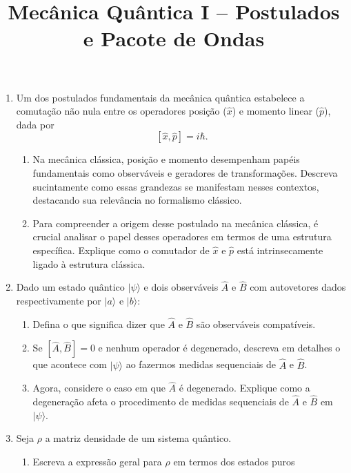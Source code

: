 \newif\ifuseseminar
\useseminartrue


\title{Mecânica Quântica I -- Postulados e Pacote de Ondas}



\begin{enumerate}
	\item Um dos postulados fundamentais da mecânica quântica estabelece a comutação não
	      nula entre os operadores posição ($\hat{x}$) e momento linear ($\hat{p}$), dada por
	      $$[\hat{x}, \hat{p}] = i\hbar.$$
	      \begin{enumerate}
		      \item Na mecânica clássica, posição e momento desempenham papéis
		            fundamentais como observáveis e geradores de transformações. Descreva
		            sucintamente como essas grandezas se manifestam nesses contextos,
		            destacando sua relevância no formalismo clássico.
		      \item Para compreender a origem desse postulado na mecânica clássica, é
		            crucial analisar o papel desses operadores em termos de uma estrutura
		            específica. Explique como o comutador de $\hat{x}$ e $\hat{p}$ está
		            intrinsecamente ligado à estrutura clássica.
	      \end{enumerate}
	\item Dado um estado quântico $|\psi\rangle$ e dois observáveis $\widehat{A}$ e
	      $\widehat{B}$ com autovetores dados respectivamente por $|a\rangle$ e $|b\rangle$:
	      \begin{enumerate}
		      \item Defina o que significa dizer que $\widehat{A}$ e $\widehat{B}$ são
		            observáveis compatíveis.
		      \item Se $[\widehat{A}, \widehat{B}] = 0$ e nenhum operador é degenerado,
		            descreva em detalhes o que acontece com $|\psi\rangle$ ao fazermos medidas
		            sequenciais de $\widehat{A}$ e $\widehat{B}$.
		      \item Agora, considere o caso em que $\widehat{A}$ é degenerado. Explique
		            como a degeneração afeta o procedimento de medidas sequenciais de
		            $\widehat{A}$ e $\widehat{B}$ em $|\psi\rangle$.
	      \end{enumerate}
	\item Seja $\rho$ a matriz densidade de um sistema quântico.
	      \begin{enumerate}
		      \item Escreva a expressão geral para $\rho$ em termos dos estados puros

\end{enumerate}
\end{enumerate}
